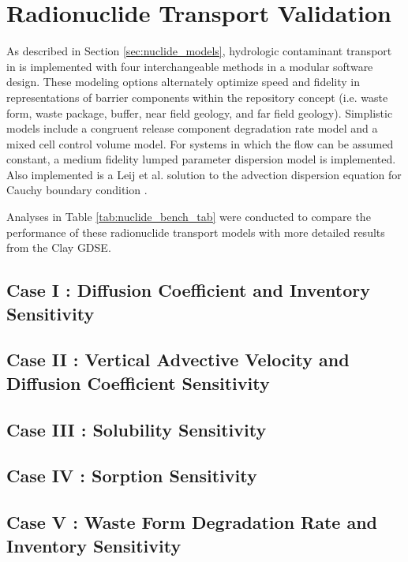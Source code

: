 \section{Radionuclide Transport Validation}\label{sec:nuclide_benchmarks}

As described in Section \ref{sec:nuclide_models}, hydrologic contaminant 
transport in \Cyder is implemented with four interchangeable  methods in a 
modular software design. These modeling options alternately optimize speed and 
fidelity in representations of barrier components within the repository concept 
(i.e. waste form, waste package, buffer, near field geology, and far field 
geology)\cite{huff_hydrologic_2013}.  Simplistic models include a congruent 
release component degradation rate model and a mixed cell control volume model. For 
systems in which the flow can be assumed constant, a medium fidelity lumped 
parameter dispersion model is implemented. Also implemented is a Leij et al. 
solution to the advection dispersion equation for Cauchy boundary condition 
\cite{leij_analytical_1991, van_genuchten_analytical_1982}.  

Analyses in Table \ref{tab:nuclide_bench_tab} were conducted to compare the 
performance of these radionuclide transport models with more detailed results from the 
Clay \gls{GDSE}. 




\subsection{Case I : Diffusion Coefficient and Inventory Sensitivity}

\subsection{Case II : Vertical Advective Velocity and Diffusion Coefficient Sensitivity}

\subsection{Case III : Solubility Sensitivity}

\subsection{Case IV : Sorption Sensitivity}

\subsection{Case V : Waste Form Degradation Rate and Inventory Sensitivity}

%
